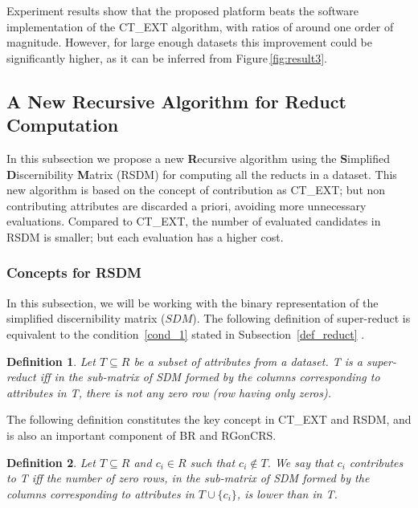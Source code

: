\documentclass[authoryear,11pt]{elsarticle}
\newtheorem{definition}{Definition}
\begin{document}
	Experiment results show that the proposed platform beats the software implementation of
	the CT\_EXT algorithm, with ratios of around one order of magnitude. However, for large 
	enough datasets this improvement could be significantly higher, as it can be inferred from 
	Figure\,\ref{fig:result3}.


\subsection{A New Recursive Algorithm for Reduct Computation}\label{RSDM}
	In this subsection we propose a new \textbf{R}ecursive algorithm using the \textbf{S}implified 
	\textbf{D}iscernibility \textbf{M}atrix (RSDM) for computing all the reducts in a dataset. This
	new algorithm is based on the concept of contribution as CT\_EXT; but non contributing attributes
	are discarded a priori, avoiding more unnecessary evaluations. Compared to CT\_EXT, the number 
	of evaluated candidates in RSDM is smaller; but each evaluation has a higher cost. 

\subsubsection{Concepts for RSDM}
	In this subsection, we will be working with the binary representation of the simplified discernibility matrix
	($SDM$). The following definition of super-reduct is equivalent to the condition~\ref{cond_1} stated in 
	Subsection~\ref{def_reduct} \citep{Lazo15}.
	
	\begin{definition}\label{def:testor}
		Let $T \subseteq R$ be a subset of attributes from a dataset. T is a super-reduct iff in the
		sub-matrix of SDM formed by the columns corresponding to attributes in T, there is not any zero row (row 
		having only zeros).
	\end{definition}
	
	The following definition constitutes the key concept in CT\_EXT and RSDM, and is also an important component 
	of BR and RGonCRS.
		
	\begin{definition}\label{def:contrib}
		Let $T \subseteq R$ and  $c_i \in R$ such that $c_i \notin T$. We say that $c_i$ contributes to T iff the
		number of zero rows, in the sub-matrix of SDM formed by the columns corresponding to attributes in 
		$T\cup\{c_i\}$, is lower than in T.
	\end{definition}		
		
\end{document}
